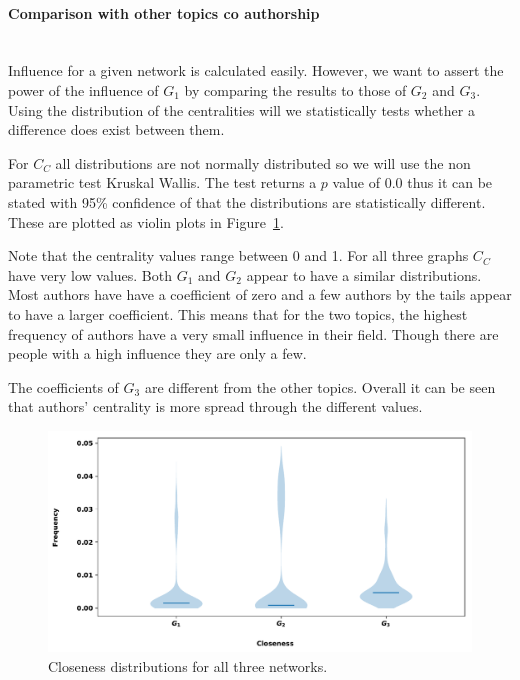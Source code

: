 \documentclass{article}
\theoremstyle{definition}
\begin{document}
\paragraph{Comparison with other topics co authorship}
\mbox{ }\\

Influence for a given network is calculated easily. However, we want to assert
the power of the influence of \(G_1\) by comparing the results to those of
\(G_2\) and \(G_3\). Using the distribution of the centralities will we
statistically tests whether a difference does exist between them.

For \(C_C\) all distributions are not normally distributed so we will use the
non parametric test Kruskal Wallis. The test returns a \(p\) value of 0.0 thus 
it can be stated with 95\% confidence of that the distributions are statistically
different. These are plotted as violin plots in Figure~\ref{fig:closeness_dist}.

Note that the centrality values range between 0 and 1. For all three graphs \(C_C\)
have very low values. Both \(G_1\) and \(G_2\) appear to have a similar distributions.
Most authors have have a coefficient of zero and a few authors by the tails
appear to have a larger coefficient. This means that for the two topics, the highest
frequency of authors have a very small influence in their field. Though there 
are people with a high influence they are only a few.

The coefficients of \(G_3\) are different from the other topics. Overall it
can be seen that authors' centrality is more spread through the different values.

\begin{figure}[!hbtp]
    \centering
    \includegraphics[width=.8\textwidth]{./assets/images/Closeness_histrograms.pdf}
    \caption{Closeness distributions for all three networks.}\label{fig:closeness_dist}
\end{figure}
\end{document}
